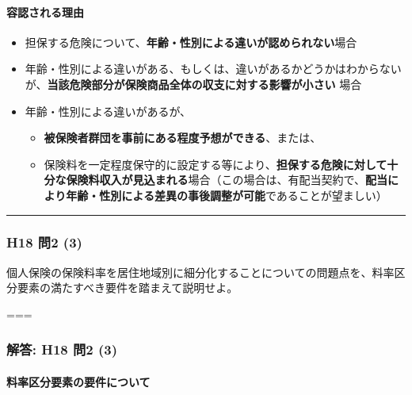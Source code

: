 \documentclass[]{article}
\begin{document}
\hypertarget{ux5bb9ux8a8dux3055ux308cux308bux7406ux7531}{%
\paragraph{容認される理由}\label{ux5bb9ux8a8dux3055ux308cux308bux7406ux7531}}

\begin{itemize}
\tightlist
\item
  担保する危険について、\textbf{年齢・性別による違いが認められない}場合
\item
  年齢・性別による違いがある、もしくは、違いがあるかどうかはわからないが、\textbf{当該危険部分が保険商品全体の収支に対する影響が小さい}
  場合
\item
  年齢・性別による違いがあるが、

  \begin{itemize}
  \tightlist
  \item
    \textbf{被保険者群団を事前にある程度予想ができる}、または、
  \item
    保険料を一定程度保守的に設定する等により、\textbf{担保する危険に対して十分な保険料収入が見込まれる}場合（この場合は、有配当契約で、\textbf{配当により年齢・性別による差異の事後調整が可能}であることが望ましい）
  \end{itemize}
\end{itemize}

\begin{center}\rule{0.5\linewidth}{0.5pt}\end{center}

\hypertarget{h18-ux554f2-3}{%
\subsubsection{H18 問2 (3)}\label{h18-ux554f2-3}}

個人保険の保険料率を居住地域別に細分化することについての問題点を、料率区分要素の満たすべき要件を踏まえて説明せよ。

===

\hypertarget{ux89e3ux7b54-h18-ux554f2-3}{%
\subsubsection{解答: H18 問2 (3)}\label{ux89e3ux7b54-h18-ux554f2-3}}

\hypertarget{ux6599ux7387ux533aux5206ux8981ux7d20ux306eux8981ux4ef6ux306bux3064ux3044ux3066}{%
\paragraph{料率区分要素の要件について}\label{ux6599ux7387ux533aux5206ux8981ux7d20ux306eux8981ux4ef6ux306bux3064ux3044ux3066}}
\end{document}
